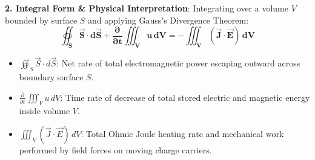 \begin{theorysol}
\textbf{2. Integral Form \& Physical Interpretation}:
Integrating over a volume $V$ bounded by surface $S$ and applying Gauss's Divergence Theorem:
\begin{equation}
\mathbf{\oiint_S \vec{S}\cdot d\vec{S} + \frac{\partial}{\partial t}\iiint_V u\,dV = -\iiint_V (\vec{J}\cdot\vec{E})\,dV}
\end{equation}
\begin{itemize}
    \item $\oiint_S \vec{S}\cdot d\vec{S}$: Net rate of total electromagnetic power escaping outward across boundary surface $S$.
    \item $\frac{\partial}{\partial t}\iiint_V u\,dV$: Time rate of decrease of total stored electric and magnetic energy inside volume $V$.
    \item $\iiint_V (\vec{J}\cdot\vec{E})\,dV$: Total Ohmic Joule heating rate and mechanical work performed by field forces on moving charge carriers.
\end{itemize}
\end{theorysol}
\vspace{4mm}

